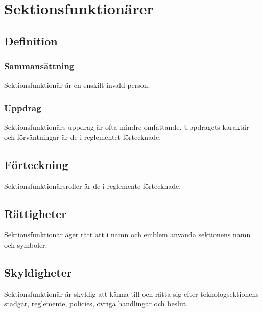 \section{Sektionsfunktionärer}
\subsection{Definition}
\subsubsection{Sammansättning}
Sektionsfunktionär är en enskilt invald person.
\subsubsection{Uppdrag}
Sektionsfunktionärs uppdrag är ofta mindre omfattande. Uppdragets karaktär och förväntningar är de i reglementet förtecknade.

\subsection{Förteckning}
Sektionsfunktionärsroller är de i reglemente förtecknade.

\subsection{Rättigheter}
Sektionsfunktionär äger rätt att i namn och emblem använda sektionens namn och symboler.

\subsection{Skyldigheter}
Sektionsfunktionär är skyldig att känna till och rätta sig efter teknologsektionens stadgar, reglemente, policies, övriga handlingar och beslut.
